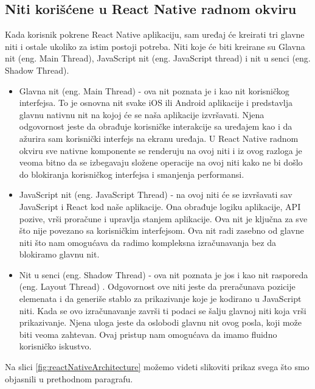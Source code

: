 \documentclass[12pt,oneside]{memoir}
\begin{document}
\subsection{Niti korišćene u React Native radnom okviru}

Kada korisnik pokrene React Native aplikaciju, sam uređaj će kreirati tri glavne niti\cite{threads} i ostale ukoliko za istim postoji potreba. Niti koje će biti kreirane su Glavna nit (eng. Main Thread), JavaScript nit (eng. JavaScript thread) i nit u senci (eng. Shadow Thread).

\begin{itemize}
    \item Glavna nit\cite{RNArch} (eng. Main Thread) - ova nit poznata je i kao nit korisničkog interfejsa. To je osnovna nit svake iOS ili Android aplikacije i predstavlja glavnu nativnu nit na kojoj će se naša aplikacije izvršavati. Njena odgovornost jeste da obrađuje korisničke interakcije sa uređajem kao i da ažurira sam korisnički interfejs na ekranu uređaja. U React Native radnom okviru sve nativne komponente se renderuju na ovoj niti i iz ovog razloga je veoma bitno da se izbegavaju složene operacije na ovoj niti kako ne bi došlo do blokiranja korisničkog interfejsa i smanjenja performansi.
    \item JavaScript nit (eng. JavaScript Thread) - na ovoj niti će se izvršavati sav JavaScript i React kod naše aplikacije. Ona obrađuje logiku aplikacije, API pozive, vrši proračune i upravlja stanjem aplikacije. Ova nit je ključna za sve što nije povezano sa korisničkim interfejsom. Ova nit radi zasebno od glavne niti što nam omogućava da radimo kompleksna izračunavanja bez da blokiramo glavnu nit. 
    \item Nit u senci (eng. Shadow Thread) - ova nit poznata je jos i kao nit rasporeda (eng. Layout Thread) . Odgovornost ove niti jeste da preračunava pozicije elemenata i da generiše stablo za prikazivanje koje je kodirano u JavaScript niti. Kada se ovo izračunavanje završi ti podaci se šalju glavnoj niti koja vrši prikazivanje. Njena uloga jeste da oslobodi glavnu nit ovog posla, koji može biti veoma zahtevan. Ovaj pristup nam omogućava da imamo fluidno korisničko iskustvo.
\end{itemize}

Na slici \ref{fig:reactNativeArchitecture} možemo videti slikoviti prikaz svega što smo objasnili u prethodnom paragrafu.
\end{document}
